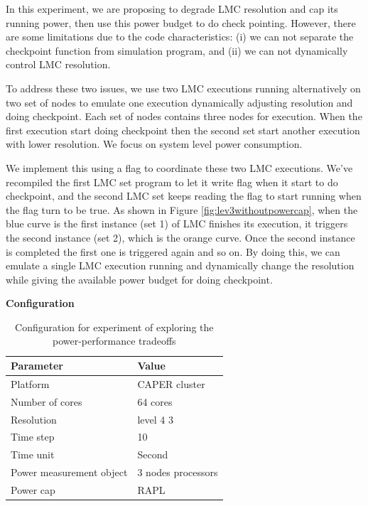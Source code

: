 In this experiment, we are proposing to degrade LMC resolution and cap its running power, then use this power budget to do check pointing. However, there are some limitations due to the code characteristics: (i) we can not separate the checkpoint function from simulation program, and (ii) we can not dynamically control LMC resolution. 

To address these two issues, we use two LMC executions running alternatively on two set of nodes to emulate one execution dynamically adjusting resolution and doing checkpoint. Each set of nodes contains three nodes for execution. When the first execution start doing checkpoint then the second set start another execution with lower resolution. We focus on system level power consumption. 

We implement this using a flag to coordinate these two LMC executions. We've recompiled the first LMC set program to let it write flag when it start to do checkpoint, and the second LMC set keeps reading the flag to start running when the flag turn to be true. As shown in Figure \ref{fig:lev3withoutpowercap}, when the blue curve is the first instance (set 1) of LMC finishes its execution, it triggers the second instance (set 2), which is the orange curve. Once the second instance is completed the first one is triggered again and so on. By doing this, we can emulate a single LMC execution running and dynamically change the resolution while giving the available power budget for doing checkpoint.



\textbf{Configuration}
\begin{table}[H]
\begin{center}
\begin{tabular}{|l|l|}
	\hline
	\textbf{Parameter} & \textbf{Value}\\ \hline
    Platform & CAPER cluster\\ 		\hline
    Number of cores & 64 cores\\
	\hline
    Resolution & level 4 3\\
    \hline
    Time step & 10\\
    \hline
    Time unit & Second\\
    \hline
    Power measurement object & 3 nodes processors\\
    \hline
    Power cap & RAPL\\
    \hline
\end{tabular}
\end{center}
\caption{Configuration for experiment of exploring the power-performance tradeoffs 
}
\label{table:table_tradeoff}
\end{table}



